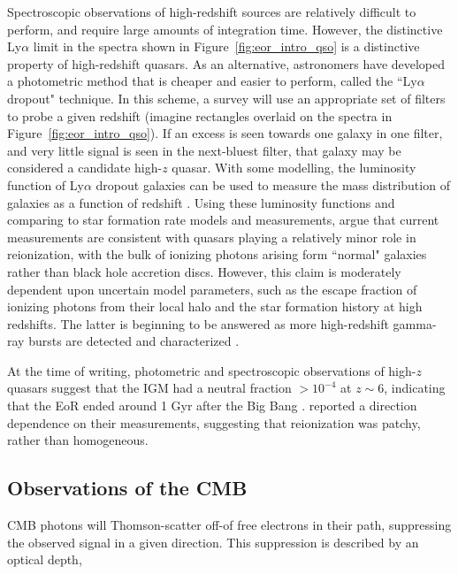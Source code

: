 Spectroscopic observations of high-redshift sources are relatively difficult to perform, and require large amounts of integration time. However, the distinctive Ly$\alpha$ limit in the spectra shown in Figure~\ref{fig:eor_intro_qso} is a distinctive property of high-redshift quasars. As an alternative, astronomers have developed a photometric method that is cheaper and easier to perform, called the ``Ly$\alpha$ dropout" technique. In this scheme, a survey will use an appropriate set of filters to probe a given redshift (imagine rectangles overlaid on the spectra in Figure~\ref{fig:eor_intro_qso}). If an excess is seen towards one galaxy in one filter, and very little signal is seen in the next-bluest filter, that galaxy may be considered a candidate high-$z$ quasar. With some modelling, the luminosity function of  Ly$\alpha$ dropout galaxies can be used to measure the mass distribution of galaxies as a function of redshift \citep[e.g.][]{Bouwens.15, Bouwens.16}. Using these luminosity functions and comparing to star formation rate models and measurements, \cite{Robertson.15} argue that current measurements are consistent with quasars playing a relatively minor role in reionization, with the bulk of ionizing photons arising form ``normal" galaxies rather than black hole accretion discs. However, this claim is moderately dependent upon uncertain model parameters, such as the escape fraction of ionizing photons from their local halo \citep{Robertson.13} and the star formation history at high redshifts. The latter is beginning to be answered as more high-redshift gamma-ray bursts are detected and characterized \citep{Wang.09, Robertson.12, Wang.15}.

At the time of writing, photometric and spectroscopic observations of high-$z$ quasars suggest that the IGM had a neutral fraction $>10^{-4}$ at $z\sim 6$, indicating that the EoR ended around 1 Gyr after the Big Bang \citep{Barnett.17}. \cite{Fan.06.2} reported a direction dependence on their measurements, suggesting that reionization was patchy, rather than homogeneous.

\subsection{Observations of the CMB}
CMB photons will Thomson-scatter off-of free electrons in their path, suppressing the observed signal in a given direction. This suppression is described by an optical depth,

